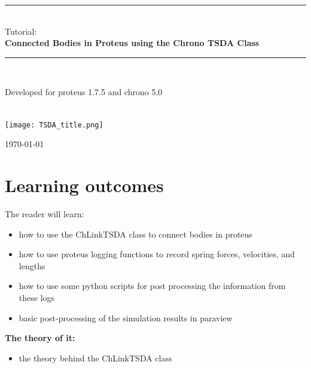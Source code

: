 \documentclass{report}
\newcommand{\HRule}{\rule{\linewidth}{0.5mm}}
\begin{document}
 \begin{titlepage}
  \begin{center}
 
 
	

	

        \HRule \\[0.4cm]
        Tutorial:\\[0.2cm]
	{ \huge \bfseries Connected Bodies in Proteus using the Chrono TSDA Class}\\[0.4cm]
	\HRule \\[1cm]

        \begin{minipage}{0.35\textwidth}
        Developed for proteus 1.7.5 and chrono 5.0 \newline \newline \newline \newline \newline \newline \newline \\
	\end{minipage}\\[1cm]

	

	\texttt{[image: TSDA\_title.png]}
	
	\vfill


	{\large \today}
	 
	\end{center}

 \end{titlepage}


\chapter*{Learning outcomes}

\noindent The reader will learn:\\[0.4cm]

\begin{itemize}
\item how to use the ChLinkTSDA class to connect bodies in proteus
\item how to use proteus logging functions to record spring forces, velocities, and lengths
\item how to use some python scripts for post processing the information from these logs
\item basic post-processing of the simulation results in paraview
\end{itemize}
{\bf The theory of it:}
\begin{itemize}
\item the theory behind the ChLinkTSDA class
\end{itemize}
\end{document}
